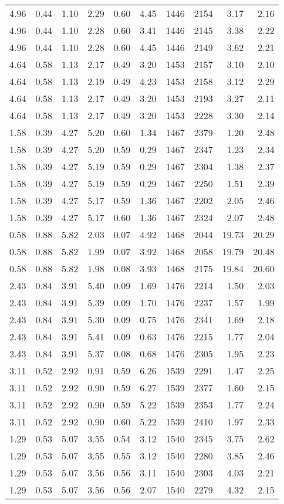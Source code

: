\begin{longtable}{rrrrrrrrrr}
4.96	&	0.44	&	1.10	&	2.29	&	0.60	&	4.45	&	1446	&	2154	&	3.17	&	2.16	\\
4.96	&	0.44	&	1.10	&	2.28	&	0.60	&	3.41	&	1446	&	2145	&	3.38	&	2.22	\\
4.96	&	0.44	&	1.10	&	2.28	&	0.60	&	4.45	&	1446	&	2149	&	3.62	&	2.21	\\
4.64	&	0.58	&	1.13	&	2.17	&	0.49	&	3.20	&	1453	&	2157	&	3.10	&	2.10	\\
4.64	&	0.58	&	1.13	&	2.19	&	0.49	&	4.23	&	1453	&	2158	&	3.12	&	2.29	\\
4.64	&	0.58	&	1.13	&	2.17	&	0.49	&	3.20	&	1453	&	2193	&	3.27	&	2.11	\\
4.64	&	0.58	&	1.13	&	2.17	&	0.49	&	3.20	&	1453	&	2228	&	3.30	&	2.14	\\
1.58	&	0.39	&	4.27	&	5.20	&	0.60	&	1.34	&	1467	&	2379	&	1.20	&	2.48	\\
1.58	&	0.39	&	4.27	&	5.20	&	0.59	&	0.29	&	1467	&	2347	&	1.23	&	2.34	\\
1.58	&	0.39	&	4.27	&	5.19	&	0.59	&	0.29	&	1467	&	2304	&	1.38	&	2.37	\\
1.58	&	0.39	&	4.27	&	5.19	&	0.59	&	0.29	&	1467	&	2250	&	1.51	&	2.39	\\
1.58	&	0.39	&	4.27	&	5.17	&	0.59	&	1.36	&	1467	&	2202	&	2.05	&	2.46	\\
1.58	&	0.39	&	4.27	&	5.17	&	0.60	&	1.36	&	1467	&	2324	&	2.07	&	2.48	\\
0.58	&	0.88	&	5.82	&	2.03	&	0.07	&	4.92	&	1468	&	2044	&	19.73	&	20.29	\\
0.58	&	0.88	&	5.82	&	1.99	&	0.07	&	3.92	&	1468	&	2058	&	19.79	&	20.48	\\
0.58	&	0.88	&	5.82	&	1.98	&	0.08	&	3.93	&	1468	&	2175	&	19.84	&	20.60	\\
2.43	&	0.84	&	3.91	&	5.40	&	0.09	&	1.69	&	1476	&	2214	&	1.50	&	2.03	\\
2.43	&	0.84	&	3.91	&	5.39	&	0.09	&	1.70	&	1476	&	2237	&	1.57	&	1.99	\\
2.43	&	0.84	&	3.91	&	5.30	&	0.09	&	0.75	&	1476	&	2341	&	1.69	&	2.18	\\
2.43	&	0.84	&	3.91	&	5.41	&	0.09	&	0.63	&	1476	&	2215	&	1.77	&	2.04	\\
2.43	&	0.84	&	3.91	&	5.37	&	0.08	&	0.68	&	1476	&	2305	&	1.95	&	2.23	\\
3.11	&	0.52	&	2.92	&	0.91	&	0.59	&	6.26	&	1539	&	2291	&	1.47	&	2.25	\\
3.11	&	0.52	&	2.92	&	0.90	&	0.59	&	6.27	&	1539	&	2377	&	1.60	&	2.15	\\
3.11	&	0.52	&	2.92	&	0.90	&	0.59	&	5.22	&	1539	&	2353	&	1.77	&	2.24	\\
3.11	&	0.52	&	2.92	&	0.90	&	0.60	&	5.22	&	1539	&	2410	&	1.97	&	2.33	\\
1.29	&	0.53	&	5.07	&	3.55	&	0.54	&	3.12	&	1540	&	2345	&	3.75	&	2.62	\\
1.29	&	0.53	&	5.07	&	3.55	&	0.55	&	3.12	&	1540	&	2280	&	3.85	&	2.46	\\
1.29	&	0.53	&	5.07	&	3.56	&	0.56	&	3.11	&	1540	&	2303	&	4.03	&	2.21	\\
1.29	&	0.53	&	5.07	&	3.56	&	0.56	&	2.07	&	1540	&	2279	&	4.32	&	2.15	\\

\end{longtable}
